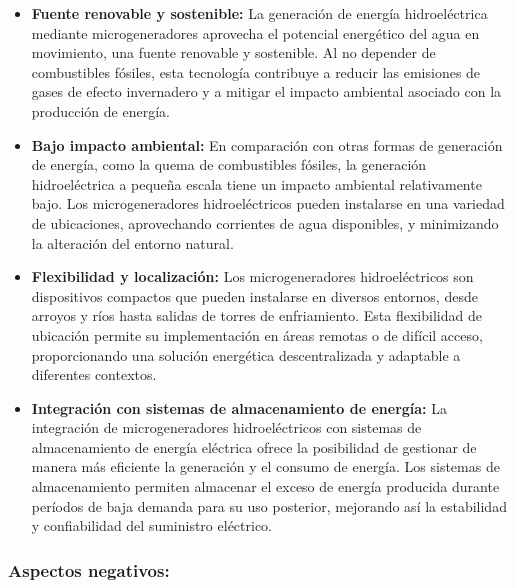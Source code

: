 \documentclass[11pt]{article}
\begin{document}
            \begin{itemize}
                \item \textbf{Fuente renovable y sostenible:} La generación de energía hidroeléctrica mediante
                microgeneradores aprovecha el potencial energético del agua en movimiento, una fuente
                renovable y sostenible. Al no depender de combustibles fósiles, esta tecnología contribuye a
                reducir las emisiones de gases de efecto invernadero y a mitigar el impacto ambiental
                asociado con la producción de energía.
                
                \item \textbf{Bajo impacto ambiental:} En comparación con otras formas de generación de energía, como
                la quema de combustibles fósiles, la generación hidroeléctrica a pequeña escala tiene un
                impacto ambiental relativamente bajo. Los microgeneradores hidroeléctricos pueden
                instalarse en una variedad de ubicaciones, aprovechando corrientes de agua disponibles, y
                minimizando la alteración del entorno natural.
                
                \item \textbf{Flexibilidad y localización: }Los microgeneradores hidroeléctricos son dispositivos compactos
                que pueden instalarse en diversos entornos, desde arroyos y ríos hasta salidas de torres de
                enfriamiento. Esta flexibilidad de ubicación permite su implementación en áreas remotas o
                de difícil acceso, proporcionando una solución energética descentralizada y adaptable a
                diferentes contextos.

                \item \textbf{Integración con sistemas de almacenamiento de energía:} La integración de
                microgeneradores hidroeléctricos con sistemas de almacenamiento de energía eléctrica
                ofrece la posibilidad de gestionar de manera más eficiente la generación y el consumo de
                energía. Los sistemas de almacenamiento permiten almacenar el exceso de energía
                producida durante períodos de baja demanda para su uso posterior, mejorando así la
                estabilidad y confiabilidad del suministro eléctrico.
            \end{itemize} 

            
            \subsubsection{Aspectos negativos:}
\end{document}

